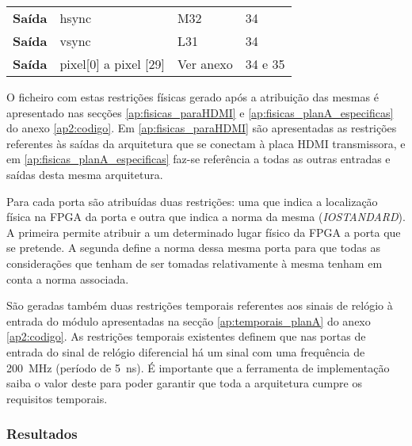 \begin{table}[h!]
\begin{tabular}{rlll}
			\multicolumn{1}{r|}{\textbf{Saída}}   & hsync                              & M32                                      & 34                                         \\
			\multicolumn{1}{r|}{\textbf{Saída}}   & vsync                              & L31                                      & 34                                         \\
			\multicolumn{1}{r|}{\textbf{Saída}}   & pixel[0] a pixel [29]                              & Ver anexo                                & 34 e 35                                    \\ \hline
		\end{tabular}

\end{table}

O ficheiro com estas restrições físicas gerado após a atribuição das mesmas é apresentado nas secções \ref{ap:fisicas_paraHDMI} e \ref{ap:fisicas_planA_especificas} do anexo \ref{ap2:codigo}. Em \ref{ap:fisicas_paraHDMI} são apresentadas as restrições referentes às saídas da arquitetura que se conectam à placa HDMI transmissora, e em \ref{ap:fisicas_planA_especificas} faz-se referência a todas as outras entradas e saídas desta mesma arquitetura.

Para cada porta são atribuídas duas restrições: uma que indica a localização física na FPGA da porta e outra que indica a norma da mesma (\textit{IOSTANDARD}). A primeira permite atribuir a um determinado lugar físico da FPGA a porta que se pretende. A segunda define a norma dessa mesma porta para que todas as considerações que tenham de ser tomadas relativamente à mesma tenham em conta a norma associada.

São geradas também duas restrições temporais referentes aos sinais de relógio à entrada do módulo apresentadas na secção \ref{ap:temporais_planA} do anexo \ref{ap2:codigo}. As restrições temporais existentes definem que nas portas de entrada do sinal de relógio diferencial há um sinal com uma frequência de \SI{200}{\mega\hertz} (período de \SI{5}{\nano\second}). É importante que a ferramenta de implementação saiba o valor deste para poder garantir que toda a arquitetura cumpre os requisitos temporais.

\subsubsection*{Resultados}

